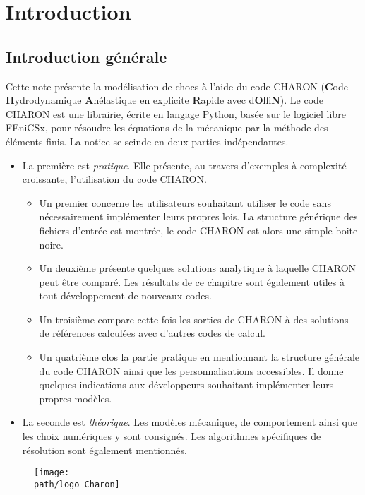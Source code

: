 \documentclass[10pt]{book}
\def\path{./fig}
\begin{document}
\setcounter{chapter}{-1}
\chapter{Introduction}\label{Chapitre:Introduction}
\section*{Introduction générale}
Cette note présente la modélisation de chocs à l'aide du code CHARON (\textbf{C}ode \textbf{H}ydrodynamique \textbf{A}nélastique en explicite \textbf{R}apide avec d\textbf{O}lfi\textbf{N}). Le code CHARON est une librairie, écrite en langage Python, basée sur le logiciel libre FEniCSx, pour résoudre les équations de la mécanique par la méthode des éléments finis. La notice se scinde en deux parties indépendantes.
\begin{itemize}[label=$\star$]
\item La première  est \emph{pratique}. Elle présente, au travers d'exemples à complexité croissante, l'utilisation du code CHARON. 
\begin{itemize}
\item Un premier  concerne les utilisateurs souhaitant utiliser le code sans nécessairement implémenter leurs propres lois. La structure générique des fichiers d'entrée est montrée, le code CHARON est alors une simple boite noire.
\item Un deuxième  présente quelques solutions analytique à laquelle CHARON peut être comparé. Les résultats de ce chapitre sont également utiles à tout développement de nouveaux codes.
\item Un troisième  compare cette fois les sorties de CHARON à des solutions de références calculées avec d'autres codes de calcul.
\item Un quatrième  clos la partie pratique en mentionnant la structure générale du code CHARON ainsi que les personnalisations accessibles. Il donne quelques indications aux développeurs souhaitant implémenter leurs propres modèles.
\end{itemize}
\item La seconde  est \emph{théorique}. Les modèles mécanique, de comportement ainsi que les choix numériques y sont consignés. Les algorithmes spécifiques de résolution sont également mentionnés.
\end{itemize}
\begin{figure}[h!]
\centering \texttt{[image: \\path/logo\_Charon]}
\end{figure}
\clearpage
\end{document}

